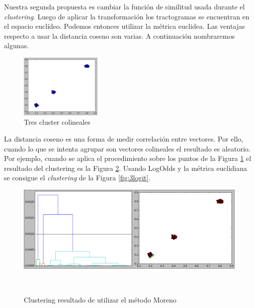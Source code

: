 Nuestra segunda propuesta es cambiar la funci\'on de similitud usada durante el 
\textit{clustering}. Luego de aplicar la transformaci\'on los tractogramas
se encuentran en el espacio eucl\'ideo. Podemos entonces utilizar la m\'etrica
euclidea. Las ventajas respecto a usar la distancia coseno son varias. A 
continuaci\'on nombraremos algunas.\\



\begin{figure}
    \begin{center}
        \vspace{-1cm}
        \includegraphics[width=0.35\textwidth]{img/3pop.png}
        \caption{Tres cluster colineales\-}
        \label{fig:3clusters}
    \end{center}
\end{figure}

La distancia coseno es una forma de medir correlaci\'on entre vectores. Por ello,
cuando lo que se intenta agrupar son vectores colineales el resultado es aleatorio.
Por ejemplo, cuando se aplica el procedimiento sobre los puntos de la Figura
\ref{fig:3clusters} el resultado del clustering es la Figura \ref{fig:3moreno}.
Usando LogOdds y la m\'etrica euclidiana se consigue el \textit{clustering} de 
la Figura \ref{fig:3logit}.\\

\vspace{1.5cm}

\begin{figure}[h!]

\centering                                                                                                          
\begin{minipage}[h]{0.8\textwidth}
    \includegraphics[width=\textwidth]{img/3pop_moreno.png}
    \caption{Clustering resultado de utilizar el m\'etodo Moreno}
    \label{fig:3moreno}
\end{minipage} ~

\end{figure}  

